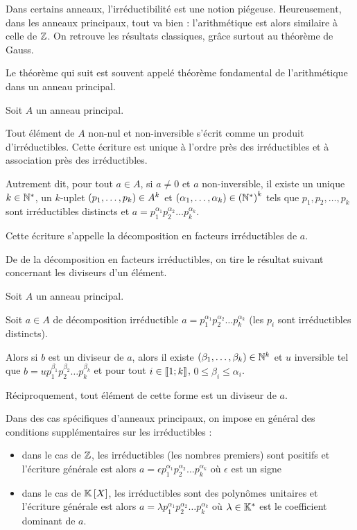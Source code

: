 Dans certains anneaux, l'irréductibilité est une notion piégeuse. Heureusement, dans les anneaux principaux, tout va bien : l'arithmétique est alors similaire à celle de \(\mathbb{Z}\). On retrouve les résultats classiques, grâce surtout au théorème de Gauss.

Le théorème qui suit est souvent appelé théorème fondamental de l'arithmétique dans un anneau principal.

\begin{theo}
Soit \(A\) un anneau principal.

Tout élément de \(A\) non-nul et non-inversible s'écrit comme un produit d'irréductibles. Cette écriture est unique à l'ordre près des irréductibles et à association près des irréductibles.

Autrement dit, pour tout \(a\in A\), si \(a\not=0\) et \(a\) non-inversible, il existe un unique \(k\in\mathbb{N}^*\), un \(k\)-uplet \(\left(p_1,\dots,p_k\right)\in A^k\) et \(\left(\alpha_1,\dots,\alpha_k\right)\in\left(\mathbb{N}^*\right)^k\) tels que \(p_1,p_2,\dots,p_k\) sont irréductibles distincts et \(a=p_1^{\alpha_1}p_2^{\alpha_2}\dots p_k^{\alpha_k}\).

Cette écriture s'appelle la décomposition en facteurs irréductibles de \(a\).
\end{theo}

De  de la décomposition en facteurs irréductibles, on tire le résultat suivant concernant les diviseurs d'un élément.

\begin{prop}
Soit \(A\) un anneau principal.

Soit \(a\in A\) de décomposition irréductible \(a=p_1^{\alpha_1}p_2^{\alpha_2}\dots p_k^{\alpha_k}\) (les \(p_i\) sont irréductibles distincts).

Alors si \(b\) est un diviseur de \(a\), alors il existe \(\left(\beta_1,\dots,\beta_k\right)\in\mathbb{N}^k\) et \(u\) inversible tel que \(b=up_1^{\beta_1}p_2^{\beta_2}\dots p_k^{\beta_k}\) et pour tout \(i\in\left\llbracket1;k\right\rrbracket\), \(0\leq\beta_i\leq\alpha_i\).

Réciproquement, tout élément de cette forme est un diviseur de \(a\).
\end{prop}

\begin{rem}
Dans des cas spécifiques d'anneaux principaux, on impose en général des conditions supplémentaires sur les irréductibles :

\begin{itemize}
    \item dans le cas de \(\mathbb{Z}\), les irréductibles (\ie les nombres premiers) sont positifs et l'écriture générale est alors \(a=\epsilon p_1^{\alpha_1}p_2^{\alpha_2}\dots p_k^{\alpha_k}\) où \(\epsilon\) est un signe \\
    \item dans le cas de \(\poly\), les irréductibles sont des polynômes unitaires et l'écriture générale est alors \(a=\lambda p_1^{\alpha_1}p_2^{\alpha_2}\dots p_k^{\alpha_k}\) où \(\lambda\in\mathbb{K}^*\) est le coefficient dominant de \(a\).
\end{itemize}
\end{rem}

